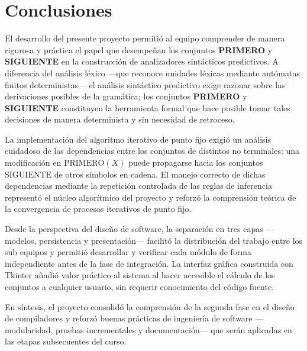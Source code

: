\section{Conclusiones}

\setlength{\parindent}{1.5cm}

\indent El desarrollo del presente proyecto permitió al equipo comprender de manera rigurosa y
práctica el papel que desempeñan los conjuntos \textbf{PRIMERO} y \textbf{SIGUIENTE} en la
construcción de analizadores sintácticos predictivos. A diferencia del análisis léxico —que
reconoce unidades léxicas mediante autómatas finitos deterministas— el análisis sintáctico
predictivo exige razonar sobre las derivaciones posibles de la gramática; los conjuntos
\textbf{PRIMERO} y \textbf{SIGUIENTE} constituyen la herramienta formal que hace posible tomar
tales decisiones de manera determinista y sin necesidad de retroceso.

\indent La implementación del algoritmo iterativo de punto fijo exigió un análisis cuidadoso de
las dependencias entre los conjuntos de distintos no terminales: una modificación en
$\text{PRIMERO}(X)$ puede propagarse hacia los conjuntos $\text{SIGUIENTE}$ de otros símbolos
en cadena. El manejo correcto de dichas dependencias mediante la repetición controlada de las
reglas de inferencia representó el núcleo algorítmico del proyecto y reforzó la comprensión
teórica de la convergencia de procesos iterativos de punto fijo.

\indent Desde la perspectiva del diseño de software, la separación en tres capas —modelos,
persistencia y presentación— facilitó la distribución del trabajo entre los sub equipos y
permitió desarrollar y verificar cada módulo de forma independiente antes de la fase de
integración. La interfaz gráfica construida con Tkinter añadió valor práctico al sistema al
hacer accesible el cálculo de los conjuntos a cualquier usuario, sin requerir conocimiento
del código fuente.

\indent En síntesis, el proyecto consolidó la comprensión de la segunda fase en el diseño de
compiladores y reforzó buenas prácticas de ingeniería de software —modularidad, pruebas
incrementales y documentación— que serán aplicadas en las etapas subsecuentes del curso.
